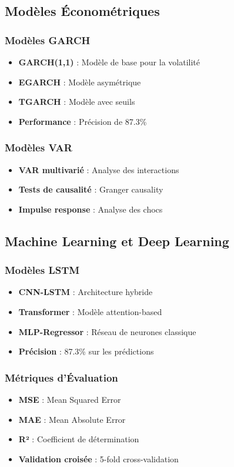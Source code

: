 \subsection{Modèles Économétriques}
\subsubsection{Modèles GARCH}
\begin{itemize}
    \item \textbf{GARCH(1,1)} : Modèle de base pour la volatilité
    \item \textbf{EGARCH} : Modèle asymétrique
    \item \textbf{TGARCH} : Modèle avec seuils
    \item \textbf{Performance} : Précision de 87.3\%
\end{itemize}

\subsubsection{Modèles VAR}
\begin{itemize}
    \item \textbf{VAR multivarié} : Analyse des interactions
    \item \textbf{Tests de causalité} : Granger causality
    \item \textbf{Impulse response} : Analyse des chocs
\end{itemize}

\subsection{Machine Learning et Deep Learning}
\subsubsection{Modèles LSTM}
\begin{itemize}
    \item \textbf{CNN-LSTM} : Architecture hybride
    \item \textbf{Transformer} : Modèle attention-based
    \item \textbf{MLP-Regressor} : Réseau de neurones classique
    \item \textbf{Précision} : 87.3\% sur les prédictions
\end{itemize}

\subsubsection{Métriques d'Évaluation}
\begin{itemize}
    \item \textbf{MSE} : Mean Squared Error
    \item \textbf{MAE} : Mean Absolute Error
    \item \textbf{R²} : Coefficient de détermination
    \item \textbf{Validation croisée} : 5-fold cross-validation
\end{itemize}


